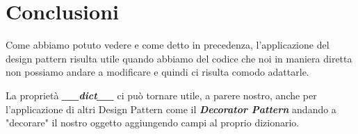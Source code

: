 \chapter{Conclusioni}

Come abbiamo potuto vedere e come detto in precedenza, l'applicazione del
design pattern risulta utile quando abbiamo del codice che noi in maniera
diretta non possiamo andare a modificare e quindi ci risulta comodo adattarle.

La proprietà \textbf{\textit{\_\_dict\_\_}} ci può tornare utile, a parere nostro,
anche per l'applicazione di altri Design Pattern come il \textbf{\textit{Decorator Pattern}}
andando a "decorare" il nostro oggetto aggiungendo campi al proprio dizionario.